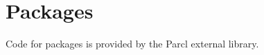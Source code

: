 \chapter{Packages}
\label{chap-packages}

Code for packages is provided by the Parcl external library.

